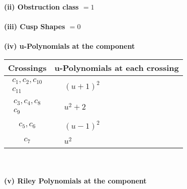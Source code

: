 \documentclass[1p]{elsarticle_modified}
\theoremstyle{definition}
\begin{document}
\flushleft \textbf{(ii) Obstruction class $= 1$}\\~\\
\flushleft \textbf{(iii) Cusp Shapes $= 0$}\\~\\
\newpage\renewcommand{\arraystretch}{1}
\flushleft \textbf{(iv) u-Polynomials at the component}\newline \\
\begin{tabular}{m{50pt}|m{274pt}}
Crossings & \hspace{64pt}u-Polynomials at each crossing \\
\hline $$\begin{aligned}c_{1},c_{2},c_{10}\\c_{11}\end{aligned}$$&$\begin{aligned}
&(u+1)^2
\end{aligned}$\\
\hline $$\begin{aligned}c_{3},c_{4},c_{8}\\c_{9}\end{aligned}$$&$\begin{aligned}
&u^2+2
\end{aligned}$\\
\hline $$\begin{aligned}c_{5},c_{6}\end{aligned}$$&$\begin{aligned}
&(u-1)^2
\end{aligned}$\\
\hline $$\begin{aligned}c_{7}\end{aligned}$$&$\begin{aligned}
&u^2
\end{aligned}$\\
\hline
\end{tabular}\\~\\
\newpage\renewcommand{\arraystretch}{1}
\flushleft \textbf{(v) Riley Polynomials at the component}\newline \\
\end{document}
